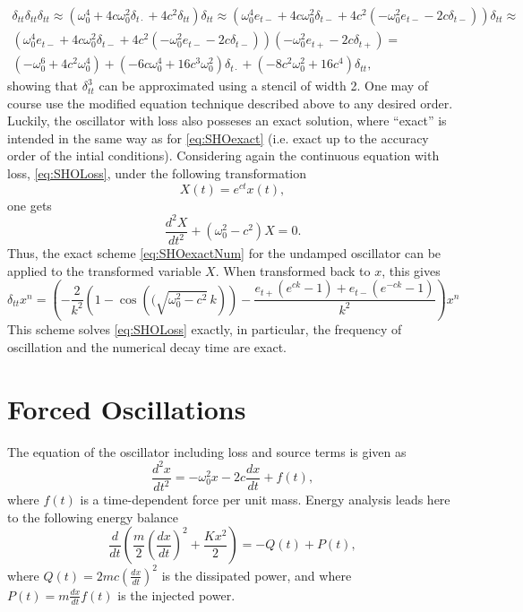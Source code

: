 \documentclass[11pt,twoside,a4paper,english]{book}
\newcommand{\etp}{e_{t+}}
\newcommand{\etm}{e_{t-}}
\newcommand{\dtp}{\delta_{t+}}
\newcommand{\dtm}{\delta_{t-}}
\newcommand{\dtd}{\delta_{t\cdot}}
\newcommand{\dtt}{\delta_{tt}}
\begin{document}
\begin{align*}
    \dtt\dtt\dtt \approx \left( \omega_0^4 + 4c \omega_0^2 \dtd + 4c^2 \dtt\right)\dtt \approx                                              
    \left( \omega_0^4\etm + 4c \omega_0^2 \dtm + 4c^2 (-\omega_0^2\etm -2c\dtm)\right)\dtt \approx                                          \\\left( \omega_0^4\etm + 4c \omega_0^2 \dtm + 4c^2 (-\omega_0^2\etm -2c\dtm)\right)(-\omega_0^2\etp -2c\dtp)= \\
    (-\omega_0^6 + 4c^2 \omega_0^4) + \left(-6 c \omega_0^4 + 16 c^3 \omega_0^2 \right)\dtd + \left( -8 c^2 \omega_0^2 + 16 c^4\right)\dtt, 
\end{align*}
showing that $\dtt^3$ can be approximated using a stencil of width 2. One may of course use the modified equation technique described above to any desired order. Luckily, the oscillator with loss also posseses an exact solution, where ``exact'' is intended in the same way as for \eqref{eq:SHOexact} (i.e. exact up to the accuracy order of the intial conditions). Considering again the continuous equation with loss, \eqref{eq:SHOLoss}, under the following transformation
\begin{equation}
    X(t) = e^{ct} x(t),
\end{equation}
one gets
\begin{equation}
    \frac{d^2X}{dt^2} + \left(\omega_0^2-c^2 \right) X = 0.
\end{equation}
Thus, the exact scheme \eqref{eq:SHOexactNum} for the undamped oscillator can be applied to the transformed variable $X$. When transformed back to $x$, this gives
\begin{equation}\label{eq:SHO2}
    \dtt x^n = \left(-\frac{2}{k^2}\left(1 - \cos\left((\sqrt{\omega_0^2-c^2} \, k\right) \right)- \frac{\etp(e^{ck}-1) + \etm(e^{-ck}-1)}{k^2}\right)x^n
\end{equation}
This scheme solves \eqref{eq:SHOLoss} exactly, in particular, the frequency of oscillation and the numerical decay time are exact.



\section{Forced Oscillations}

The equation of the oscillator including loss and source terms is given as
\begin{equation}\label{eq:SHOForced}
    \frac{d^2 x}{dt^2} = -\omega_0^2 x - 2c \frac{dx}{dt} + f(t),
\end{equation}
where $f(t)$ is a time-dependent force per unit mass. Energy analysis leads here to the following energy balance
\begin{equation}
\frac{d}{dt}\left( \frac{m}{2} \left(\frac{dx}{dt}\right)^2 + \frac{K x^2}{2}   \right) = - Q(t) + P(t),
\end{equation}
where $Q(t) = 2mc \left(\frac{dx}{dt}\right)^2$ is the dissipated power, and where $P(t) = m\frac{dx}{dt}f(t)$ is the injected power.
\end{document}
